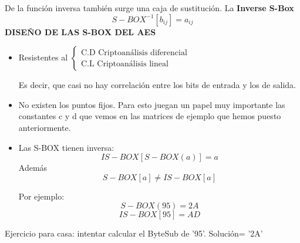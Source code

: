 \begin{itemize}
	De la función inversa también surge una caja de sustitución. La \textbf{Inverse S-Box}
	$$S-BOX^{-1}[b_{ij}] = a_{ij}$$
	\textbf{DISEÑO DE LAS S-BOX DEL AES}
	\begin{itemize}
		\item Resistentes al $\begin{cases}
			\text{C.D Criptoanálisis diferencial}\\
			\text{C.L Criptoanálisis lineal}
		\end{cases}$
		
		Es decir, que casi no hay correlación entre los bits de entrada y los de salida.
		
		\item No existen los puntos fijos. Para esto juegan un papel muy importante las constantes c y d que vemos en las matrices de ejemplo que hemos puesto anteriormente.
		
		\item Las S-BOX tienen inversa: 
		$$IS-BOX[S-BOX(a)] = a$$
		Además $$S-BOX[a]\neq IS-BOX[a]$$
		
		Por ejemplo:
		 $$S-BOX(95) = 2A$$
		 $$IS-BOX[95]=  AD$$
	\end{itemize}
	Ejercicio para casa: intentar calcular el ByteSub de '95'. Solución= '2A'
\end{itemize}
